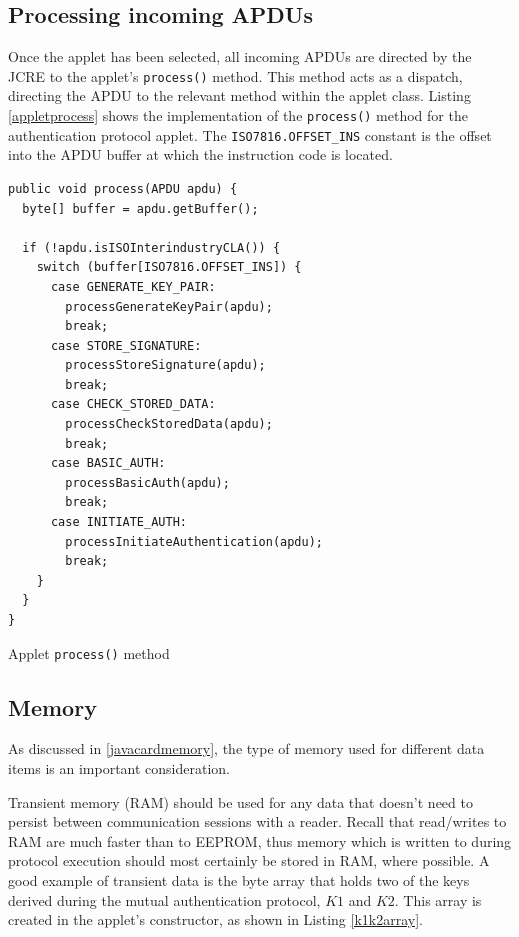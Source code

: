 \documentclass[12pt,a4paper,twoside,openright]{report}
\begin{document}
\subsection{Processing incoming APDUs}

Once the applet has been selected, all incoming APDUs are directed by the JCRE to the applet's \texttt{process()} method. This method acts as a dispatch, directing the APDU to the relevant method within the applet class. Listing \autoref{appletprocess} shows the implementation of the \texttt{process()} method for the authentication protocol applet. The \texttt{ISO7816.OFFSET\_INS} constant is the offset into the APDU buffer at which the instruction code is located.

\begin{listing}
\begin{verbatim}
public void process(APDU apdu) {
  byte[] buffer = apdu.getBuffer();

  if (!apdu.isISOInterindustryCLA()) {
    switch (buffer[ISO7816.OFFSET_INS]) {
      case GENERATE_KEY_PAIR:
        processGenerateKeyPair(apdu);
        break;
      case STORE_SIGNATURE:
        processStoreSignature(apdu);
        break;
      case CHECK_STORED_DATA:
        processCheckStoredData(apdu);
        break;
      case BASIC_AUTH:
        processBasicAuth(apdu);
        break;
      case INITIATE_AUTH:
        processInitiateAuthentication(apdu);
        break;
    }
  }
}
\end{verbatim}
\caption{Applet \texttt{process()} method}
\label{appletprocess}
\end{listing}

\subsection{Memory}

As discussed in \autoref{javacardmemory}, the type of memory used for different data items is an important consideration.

Transient memory (RAM) should be used for any data that doesn't need to persist between communication sessions with a reader. Recall that read/writes to RAM are much faster than to EEPROM, thus memory which is written to during protocol execution should most certainly be stored in RAM, where possible. A good example of transient data is the byte array that holds two of the keys derived during the mutual authentication protocol, $K1$ and $K2$. This array is created in the applet's constructor, as shown in Listing \autoref{k1k2array}.
\end{document}
